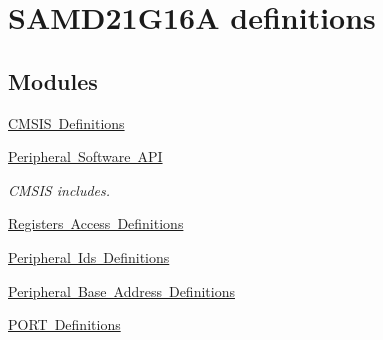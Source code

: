 \hypertarget{group___s_a_m_d21_g16_a__definitions}{}\section{S\+A\+M\+D21\+G16A definitions}
\label{group___s_a_m_d21_g16_a__definitions}
\subsection*{Modules}
\begin{DoxyCompactItemize}
\item 
\mbox{\hyperlink{group___s_a_m_d21_g16_a__cmsis}{C\+M\+S\+I\+S Definitions}}
\item 
\mbox{\hyperlink{group___s_a_m_d21_g16_a__api}{Peripheral Software A\+PI}}
\begin{DoxyCompactList}\small\item\em C\+M\+S\+IS includes. \end{DoxyCompactList}\item 
\mbox{\hyperlink{group___s_a_m_d21_g16_a__reg}{Registers Access Definitions}}
\item 
\mbox{\hyperlink{group___s_a_m_d21_g16_a__id}{Peripheral Ids Definitions}}
\item 
\mbox{\hyperlink{group___s_a_m_d21_g16_a__base}{Peripheral Base Address Definitions}}
\item 
\mbox{\hyperlink{group___s_a_m_d21_g16_a__port}{P\+O\+R\+T Definitions}}
\end{DoxyCompactItemize}
